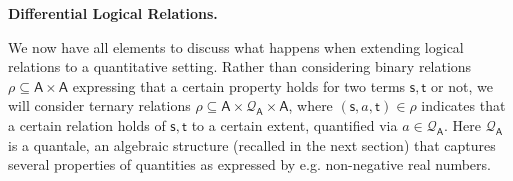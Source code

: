  
 
 
\par\medskip\noindent\textbf{Differential Logical Relations.}\par
 
 
We now have all elements to discuss what happens when extending logical relations to a quantitative setting. Rather than considering binary relations $\rho\subseteq\mathsf{A}\times\mathsf{A}$ expressing that a certain property holds for two terms $\mathsf{s},\mathsf{t}$ or not, we will consider ternary relations $\rho\subseteq\mathsf{A}\times\mathcal{Q}_{\mathsf{A}}\times\mathsf{A}$, where $(\mathsf{s},a,\mathsf{t})\in\rho$ indicates that a certain relation holds of $\mathsf{s},\mathsf{t}$ to a certain extent, quantified via $a\in\mathcal{Q}_{\mathsf{A}}$. Here $\mathcal{Q}_{\mathsf{A}}$ is a quantale, an algebraic structure (recalled in the next section) that captures several properties of quantities as expressed by e.g. non-negative real numbers.\par
 
 
 
